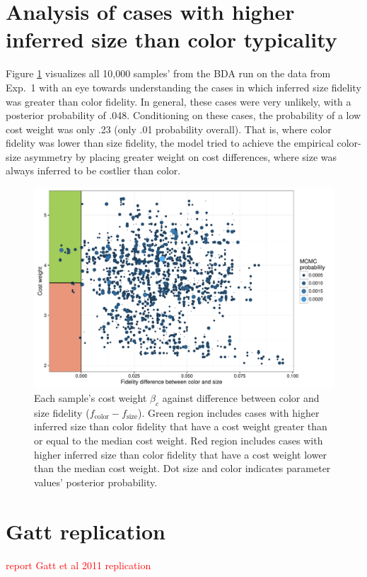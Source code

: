 \documentclass[11pt]{article}
\newcommand{\red}[1]{\textcolor{Red}{#1}}
\newcommand{\figref}[1]{Figure \ref{#1}}
\begin{document}
\section{Analysis of cases with higher inferred size than color typicality}
\label{app:fidelity-outliers}

\figref{fig:fidelity-outliers-reducedconditions} visualizes all 10,000 samples' from the BDA run on the data from Exp.~1 with an eye towards understanding the cases in which inferred size fidelity was greater than color fidelity. In general, these cases were very unlikely, with a posterior probability of .048. Conditioning on these cases, the probability of a low cost weight was only .23 (only .01 probability overall). That is, where color fidelity was lower than size fidelity, the model tried to achieve the empirical color-size asymmetry by placing greater weight on cost differences, where size was always inferred to be costlier than color.

\begin{figure}
\centering
\includegraphics[width=.7\textwidth]{../../../models/1_basic_overinformativeness/results_bda/graphs/fidelity-outliers-fixed-reducedconditions}
\caption{Each sample's cost weight $\beta_c$ against difference between color and size fidelity ($f_{\textrm{color}} - f_{\textrm{size}}$). Green region includes cases with higher inferred size than color fidelity that have a cost weight greater than or equal to the median cost weight. Red region includes cases with higher inferred size than color fidelity that have a cost weight lower than the median cost weight. Dot size and color indicates parameter values' posterior probability.}
\label{fig:fidelity-outliers-reducedconditions}
\end{figure}



\section{Gatt replication}
\red{report Gatt et al 2011 replication}



\setlength{\bibleftmargin}{.125in}
\setlength{\bibindent}{-\bibleftmargin}


\end{document}
